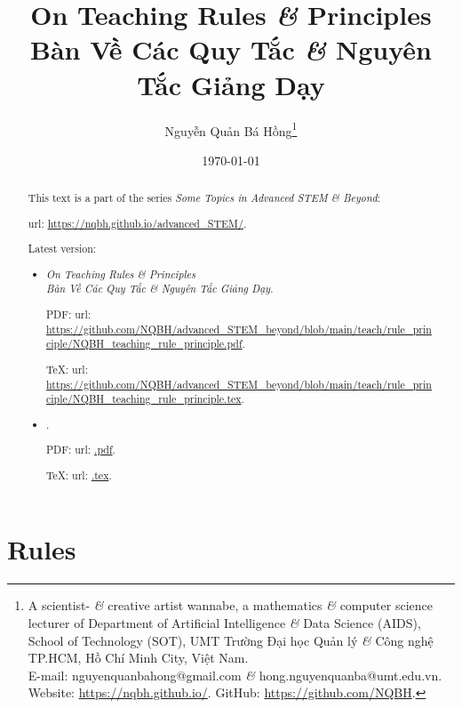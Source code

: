 \documentclass{article}
\title{On Teaching Rules {\it\&} Principles\\Bàn Về Các Quy Tắc {\it\&} Nguyên Tắc Giảng Dạy}
\author{Nguyễn Quản Bá Hồng\footnote{A scientist- {\it\&} creative artist wannabe, a mathematics {\it\&} computer science lecturer of Department of Artificial Intelligence {\it\&} Data Science (AIDS), School of Technology (SOT), UMT Trường Đại học Quản lý {\it\&} Công nghệ TP.HCM, Hồ Chí Minh City, Việt Nam.\\E-mail: {\sf nguyenquanbahong@gmail.com} {\it\&} {\sf hong.nguyenquanba@umt.edu.vn}. Website: \url{https://nqbh.github.io/}. GitHub: \url{https://github.com/NQBH}.}}
\date{\today}
\begin{document}
\maketitle
\begin{abstract}
	This text is a part of the series {\it Some Topics in Advanced STEM \& Beyond}:
	
	{\sc url}: \url{https://nqbh.github.io/advanced_STEM/}.
	
	Latest version:
	\begin{itemize}
		\item {\it On Teaching Rules \& Principles\\Bàn Về Các Quy Tắc \& Nguyên Tắc Giảng Dạy}.
		
		PDF: {\sc url}: \url{https://github.com/NQBH/advanced_STEM_beyond/blob/main/teach/rule_principle/NQBH_teaching_rule_principle.pdf}.
		
		\TeX: {\sc url}: \url{https://github.com/NQBH/advanced_STEM_beyond/blob/main/teach/rule_principle/NQBH_teaching_rule_principle.tex}.
		\item {\it }.
		
		PDF: {\sc url}: \url{.pdf}.
		
		\TeX: {\sc url}: \url{.tex}.
	\end{itemize}
\end{abstract}
\tableofcontents


\section{Rules}
\end{document}
